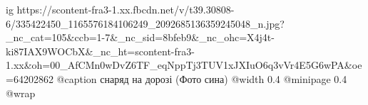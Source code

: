  
 
 
 
 

\ifcmt
  ig https://scontent-fra3-1.xx.fbcdn.net/v/t39.30808-6/335422450_1165576184106249_2092685136359245048_n.jpg?_nc_cat=105&ccb=1-7&_nc_sid=8bfeb9&_nc_ohc=X4j4t-ki87IAX9WOCbX&_nc_ht=scontent-fra3-1.xx&oh=00_AfCMn0wDvZ6TF_eqNppTj3TUV1xJXIuO6q3vVr4E5G6wPA&oe=64202862
	@caption снаряд на дорозі (Фото сина)
  @width 0.4
  @minipage 0.4
  @wrap \parpic[r]
\fi
